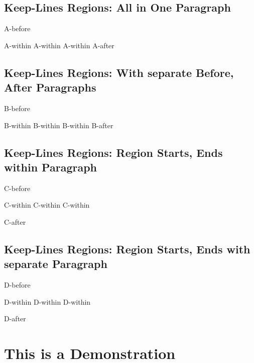 \section{Keep-Lines Regions: All in One Paragraph
}
\begin{multicols}{2}\end{multicols}A-before
\mktsShowpar\par
\begingroup\obeyalllines{}A-within
A-within
A-within
\endgroup{}A-after
\begin{multicols}{2}\end{multicols}
\section{Keep-Lines Regions: With separate Before, After Paragraphs
}
\begin{multicols}{2}\end{multicols}B-before\mktsShowpar\par
\begingroup\obeyalllines{}B-within
B-within
B-within
\endgroup{}B-after\mktsShowpar\par
\begin{multicols}{2}\end{multicols}
\section{Keep-Lines Regions: Region Starts, Ends within Paragraph
}
\begin{multicols}{2}\end{multicols}C-before
\mktsShowpar\par
\begingroup\obeyalllines{}C-within
C-within
C-within

\endgroup{}C-after
\begin{multicols}{2}\end{multicols}
\section{Keep-Lines Regions: Region Starts, Ends with separate Paragraph
}
\begin{multicols}{2}\end{multicols}D-before\mktsShowpar\par
\begingroup\obeyalllines{}D-within
D-within
D-within

\endgroup{}D-after
\begin{multicols}{2}\end{multicols}
\chapter{This is a Demonstration 
}
\begin{multicols}{2}\end{multicols}
